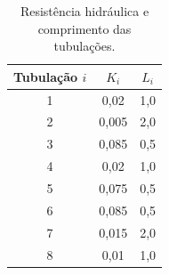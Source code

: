 \documentclass[12pt,a4paper]{article}
\begin{document}
\begin{enumerate}
\begin{table}[!htb]
 \centering
 \begin{tabular}{c|c|c}
  Tubulação $i$ & $K_i$ & $L_i$ \\ \hline
  1 & 0,02 & 1,0 \\ \hline
  2 & 0,005 & 2,0 \\ \hline
  3 & 0,085 & 0,5 \\ \hline
  4 & 0,02 & 1,0 \\ \hline
  5 & 0,075 & 0,5 \\ \hline
  6 & 0,085 & 0,5 \\ \hline
  7 & 0,015 & 2,0 \\ \hline
  8 & 0,01 & 1,0 
 \end{tabular}
 \caption{Resistência hidráulica e comprimento das tubulações.}
 \label{tab:dados}
\end{table}

\end{enumerate}
\end{document}
